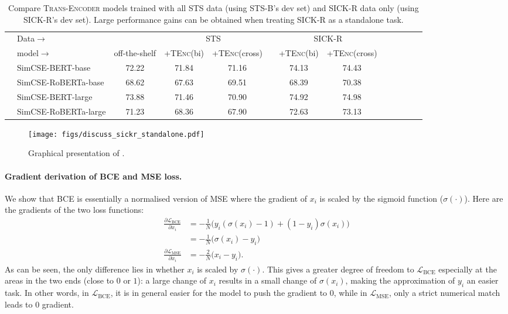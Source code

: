 \documentclass{article} \usepackage{iclr2021_conference,times}
\newcommand{\sigmoid}{\sigma}
\newcommand{\modelname}{\textsc{Trans-Encoder}\xspace}
\newcommand{\tenc}{\textsc{TEnc}\xspace}
\begin{document}
\begin{table}[!t] \setlength{\tabcolsep}{3.6pt}
\centering
\small
\begin{tabular}{llccccccccccc}
\cmidrule[1.5pt]{1-10}
&  Data$\rightarrow$  & & \multicolumn{2}{c}{STS} & & \multicolumn{2}{c}{SICK-R} & \\
\cmidrule[.5pt]{4-5} \cmidrule[.5pt]{7-8}
 & model$\rightarrow$ & off-the-shelf &  +\tenc (bi)  &  +\tenc (cross) & &  +\tenc (bi) & +\tenc (cross) & \\
\cmidrule[1.0pt]{1-10}  
& SimCSE-BERT-base & 72.22 & 71.84 & 71.16 & & 74.13 & 74.43 \\
& SimCSE-RoBERTa-base & 68.62 & 67.63 & 69.51 & & 68.39 & 70.38 \\
& SimCSE-BERT-large & 73.88  & 71.46 & 70.90 & & 74.92 & 74.98 \\
& SimCSE-RoBERTa-large & 71.23 & 68.36 & 67.90 & & 72.63 & 73.13 \\
\cmidrule[1.5pt]{1-10}
\end{tabular}
\caption{Compare \modelname models trained with all STS data (using STS-B's dev set) and SICK-R data only (using SICK-R's dev set). Large performance gains can be obtained when treating SICK-R as a standalone task. }
\label{tab:sickr_standalone}
\end{table}


\begin{figure}
    \centering
    \texttt{[image: figs/discuss\_sickr\_standalone.pdf]}
    \caption{Graphical presentation of .}
    \label{fig:sickr_standalone}
\end{figure}

\paragraph{Gradient derivation of BCE and MSE loss.} We show that BCE is essentially a normalised version of MSE where the gradient of $x_i$ is scaled by the sigmoid function ($\sigmoid(\cdot)$). Here are the gradients of the two loss functions:
\begin{equation}
    \begin{split}
    \frac{\partial \mathcal{L}_{\text{BCE}}}{\partial x_i} &= -\frac{1}{N}\Big(y_i (\sigma(x_i)-1) + (1-y_i)\sigma(x_i)\Big) \\
    &=  -\frac{1}{N}\Big(\sigma(x_i)- y_i\Big) \\
    \frac{\partial \mathcal{L}_{\text{MSE}}}{\partial x_i} &= -\frac{2}{N}\Big(x_i- y_i\Big).
\end{split}
\label{eq:gradient}
\end{equation}
As can be seen, the only difference lies in whether $x_i$ is scaled by $\sigmoid(\cdot)$. This gives a greater degree of freedom to $\mathcal{L}_{\text{BCE}}$ especially at the areas in the two ends (close to $0$ or $1$): a large change of $x_i$ results in a small change of $\sigma(x_i)$, making the approximation of $y_i$ an easier task. In other words, in $\mathcal{L}_{\text{BCE}}$, it is in general easier for the model to push the gradient to $0$, while in  $\mathcal{L}_{\text{MSE}}$, only a strict numerical match leads to $0$ gradient.
\end{document}
